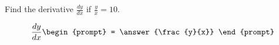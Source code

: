 \documentclass{ximera}
\author{Gregory Hartman \and Matthew Carr}
\begin{document}
\begin{exercise}



Find the derivative $\frac{dy}{dx}$ if $\frac{y}{x}=10$.

\[
\frac{dy}{dx}
\begin{prompt}
= \answer{\frac{y}{x}}
\end{prompt}
\]

\end{exercise}
\end{document}
